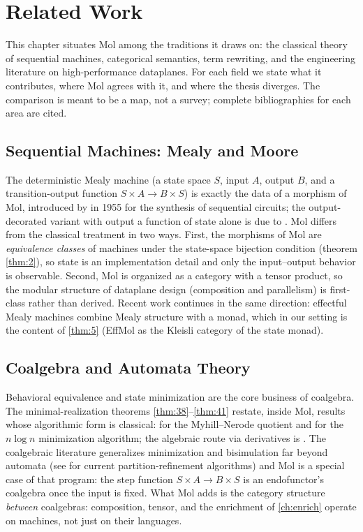 \chapter{Related Work}\label{ch:related}

This chapter situates Mol among the traditions it draws on: the classical theory of sequential machines, categorical semantics, term rewriting, and the engineering literature on high-performance dataplanes. For each field we state what it contributes, where Mol agrees with it, and where the thesis diverges. The comparison is meant to be a map, not a survey; complete bibliographies for each area are cited.

\section{Sequential Machines: Mealy and Moore}
The deterministic Mealy machine (a state space $S$, input $A$, output $B$, and a transition-output function $S \times A \to B \times S$) is exactly the data of a morphism of Mol, introduced by \cite{mealy} in 1955 for the synthesis of sequential circuits; the output-decorated variant with output a function of state alone is due to \cite{moore}. Mol differs from the classical treatment in two ways. First, the morphisms of Mol are \emph{equivalence classes} of machines under the state-space bijection condition (theorem \ref{thm:2}), so state is an implementation detail and only the input--output behavior is observable. Second, Mol is organized as a category with a tensor product, so the modular structure of dataplane design (composition and parallelism) is first-class rather than derived. Recent work continues in the same direction: effectful Mealy machines \cite{arxiv-mealy} combine Mealy structure with a monad, which in our setting is the content of \ref{thm:5} (EffMol as the Kleisli category of the state monad).

\section{Coalgebra and Automata Theory}
Behavioral equivalence and state minimization are the core business of coalgebra. The minimal-realization theorems \ref{thm:38}--\ref{thm:41} restate, inside Mol, results whose algorithmic form is classical: \cite{nerode} for the Myhill--Nerode quotient and \cite{hopcroft} for the $n\log n$ minimization algorithm; the algebraic route via derivatives is \cite{brzozowski}. The coalgebraic literature generalizes minimization and bisimulation far beyond automata (see \cite{arxiv-coalgebra-min} for current partition-refinement algorithms) and Mol is a special case of that program: the step function $S \times A \to B \times S$ is an endofunctor's coalgebra once the input is fixed. What Mol adds is the category structure \emph{between} coalgebras: composition, tensor, and the enrichment of \autoref{ch:enrich} operate on machines, not just on their languages.


